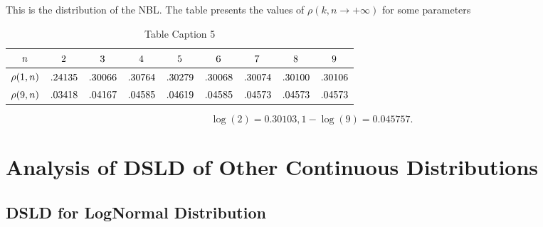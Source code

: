 \documentclass[titlepage,fleqn]{article}%
\begin{document}
This is the distribution of the NBL. The table presents the values of
$\rho(k,n\rightarrow+\infty)$ for some parameters%

\begin{table}[!htbp] \centering
\begin{tabular}
[c]{|c|c|c|c|c|c|c|c|c|}\hline\hline
${\small n}$ & ${\small 2}$ & ${\small 3}$ & ${\small 4}$ & ${\small 5}$ &
${\small 6}$ & ${\small 7}$ & ${\small 8}$ & ${\small 9}$\\\hline
${\small \rho(1,n)}$ & ${\small .24135}$ & ${\small .30066}$ &
${\small .30764}$ & ${\small .30279}$ & ${\small .30068}$ & ${\small .30074}$
& ${\small .30100}$ & ${\small .30106}$\\\hline
${\small \rho(9,n)}$ & ${\small .03418}$ & ${\small .04167}$ &
${\small .04585}$ & ${\small .04619}$ & ${\small .04585}$ & ${\small .04573}$
& ${\small .04573}$ & ${\small .04573}$\\\hline\hline
\end{tabular}
\caption{Table Caption 5}\label{TableKey5}%
\end{table}%
%

\[
\log(2)=0.30103,1-\log(9)=0.045757.
\]


\section{Analysis of DSLD of Other Continuous Distributions}%

\label{OtherContDist}%


\subsection{DSLD for LogNormal Distribution}%
\end{document}
